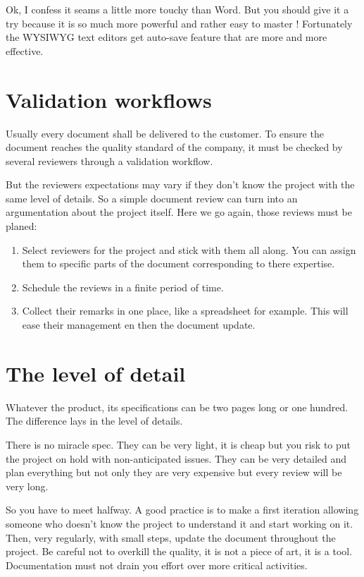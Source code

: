 Ok, I confess it seams a little more touchy than Word. But you should give it a try because it is so much more powerful and rather easy to master !
Fortunately the WYSIWYG text editors get auto-save feature that are more and more effective.


\section{Validation workflows}
Usually every document shall be delivered to the customer. To ensure the document reaches the quality standard of the company, it must be checked by several reviewers through a validation workflow.

But the reviewers expectations may vary if they don’t know the project with the same level of details. So a simple document review can turn into an argumentation about the project itself. Here we go again, those reviews must be planed:

\begin{enumerate}
	\item Select reviewers for the project and stick with them all along. You can assign them to specific parts of the document corresponding to there expertise.
	\item Schedule the reviews in a finite period of time.
	\item Collect their remarks in one place, like a spreadsheet for example. This will ease their management en then the document update.
\end{enumerate}


\section{The level of detail}
Whatever the product, its specifications can be two pages long or one hundred. The difference lays in the level of details.

There is no miracle spec. They can be very light, it is cheap but you risk to put the project on hold with non-anticipated issues. They can be very detailed and plan everything but not only they are very expensive but every review will be very long.

So you have to meet halfway. A good practice is to make a first iteration allowing someone who doesn’t know the project to understand it and start working on it. Then, very regularly, with small steps, update the document throughout the project. Be careful not to overkill the quality, it is not a piece of art, it is a tool. Documentation must not drain you effort over more critical activities.


